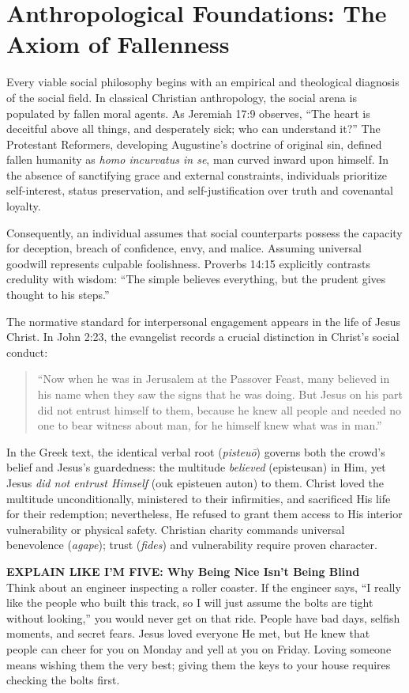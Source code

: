 \documentclass[11pt,twocolumn]{article}
\begin{document}
\section{Anthropological Foundations: The Axiom of Fallenness}
Every viable social philosophy begins with an empirical and theological diagnosis of the social field. In classical Christian anthropology, the social arena is populated by fallen moral agents. As Jeremiah 17:9 observes, ``The heart is deceitful above all things, and desperately sick; who can understand it?'' The Protestant Reformers, developing Augustine's doctrine of original sin, defined fallen humanity as \textit{homo incurvatus in se}, man curved inward upon himself. In the absence of sanctifying grace and external constraints, individuals prioritize self-interest, status preservation, and self-justification over truth and covenantal loyalty.

Consequently, an individual assumes that social counterparts possess the capacity for deception, breach of confidence, envy, and malice. Assuming universal goodwill represents culpable foolishness. Proverbs 14:15 explicitly contrasts credulity with wisdom: ``The simple believes everything, but the prudent gives thought to his steps.''

The normative standard for interpersonal engagement appears in the life of Jesus Christ. In John 2:23, the evangelist records a crucial distinction in Christ's social conduct:
\begin{quote}
``Now when he was in Jerusalem at the Passover Feast, many believed in his name when they saw the signs that he was doing. But Jesus on his part did not entrust himself to them, because he knew all people and needed no one to bear witness about man, for he himself knew what was in man.''
\end{quote}
In the Greek text, the identical verbal root (\textit{pisteu\={o}}) governs both the crowd's belief and Jesus's guardedness: the multitude \textit{believed} (episteusan) in Him, yet Jesus \textit{did not entrust Himself} (ouk episteuen auton) to them. Christ loved the multitude unconditionally, ministered to their infirmities, and sacrificed His life for their redemption; nevertheless, He refused to grant them access to His interior vulnerability or physical safety. Christian charity commands universal benevolence (\textit{agape}); trust (\textit{fides}) and vulnerability require proven character.

\begin{eli5box}
\textbf{EXPLAIN LIKE I'M FIVE: Why Being Nice Isn't Being Blind}\\
Think about an engineer inspecting a roller coaster. If the engineer says, ``I really like the people who built this track, so I will just assume the bolts are tight without looking,'' you would never get on that ride. People have bad days, selfish moments, and secret fears. Jesus loved everyone He met, but He knew that people can cheer for you on Monday and yell at you on Friday. Loving someone means wishing them the very best; giving them the keys to your house requires checking the bolts first.
\end{eli5box}
\end{document}
